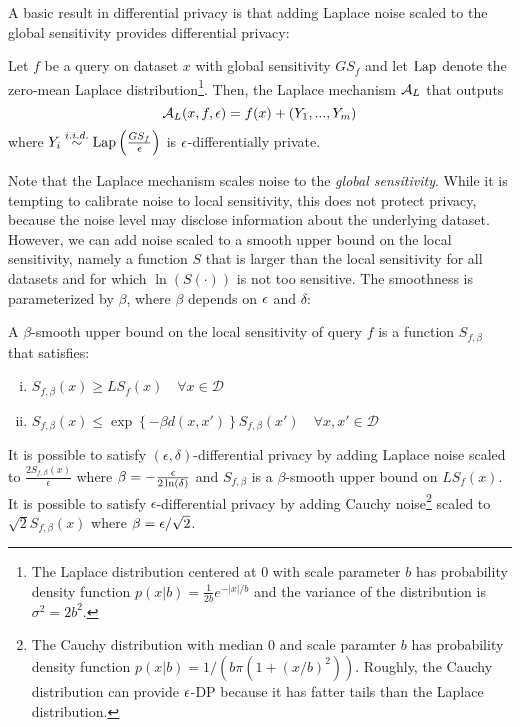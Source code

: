 A basic result in differential privacy is that adding Laplace noise scaled to the global sensitivity provides differential privacy:
\begin{theorem}
	\label{thm:laplace}
	Let $f$ be a query on dataset $x$ with global sensitivity $GS_f$ and let \emph{$\text{Lap}$} denote the zero-mean Laplace distribution\footnote{The Laplace distribution centered at $0$ with scale parameter $b$ has probability density function $p(x | b) = \frac{1}{2b} e^{-|x|/b}$ and the variance of the distribution is $\sigma^2 = 2b^2$.}. Then, the Laplace mechanism $\mathcal{A}_{L}$ that outputs 
	$$\mathcal{A}_L(x, f, \epsilon) = f(x) + (Y_1,...,Y_m)$$
	where $Y_i  \stackrel{i.i.d.}{\sim} \text{Lap}\left(\frac{GS_f}{\epsilon}\right)$ is $\epsilon$-differentially private.
\end{theorem}
Note that the Laplace mechanism scales noise to the \emph{global sensitivity}. While it is tempting to calibrate noise to local sensitivity, this does not protect privacy, because the noise level may disclose information about the underlying dataset. However, we can add noise scaled to a smooth upper bound on the local sensitivity, namely a function $S$ that is larger than the local sensitivity for all datasets and for which $\ln(S(\cdot))$ is not too sensitive. The smoothness is parameterized by $\beta$, where $\beta$ depends on $\epsilon$ and $\delta$:
\begin{theorem}
\label{thm:smooth}
A $\beta$-smooth upper bound on the local sensitivity of query $f$ is a function $S_{f, \beta}$ that satisfies:
\vspace{-0.2in}
\begin{enumerate}[(i)]
	\item $S_{f, \beta}(x) \geq LS_f(x) \quad \forall x \in \mathcal{D}$
	\item $S_{f, \beta} (x) \leq \exp\left\{- \beta d(x, x') \right\} S_{f, \beta}(x') \quad \forall x, x' \in \mathcal{D}$
\end{enumerate}
\vspace{-0.2in}
It is possible to satisfy $(\epsilon, \delta)$-differential privacy by adding Laplace noise scaled to $\frac{2S_{f,\beta}(x)}{\epsilon}$ where $\beta = -\frac{\epsilon}{2 \ln(\delta)}$ and $S_{f, \beta}$ is a $\beta$-smooth upper bound on $LS_f(x)$. It is possible to satisfy $\epsilon$-differential privacy by adding Cauchy noise\footnote{The Cauchy distribution with median $0$ and scale paramter $b$ has probability density function $p(x|b) = 1/(b \pi(1+(x/b)^2 ) )$. Roughly, the Cauchy distribution can provide $\epsilon$-DP because it has fatter tails than the Laplace distribution.} scaled to $\sqrt{2}S_{f, \beta}(x)$ where $\beta = \epsilon/\sqrt{2}$.
\end{theorem}

